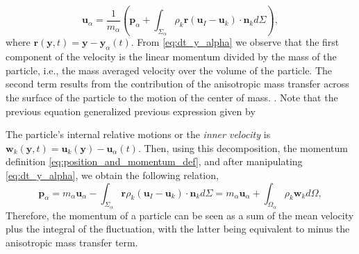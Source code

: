 \begin{equation}
    \textbf{u}_\alpha = \frac{1}{m_\alpha} \left(
        \textbf{p}_\alpha
        +  \int_{\Sigma_\alpha} \rho_k \textbf{r} (\textbf{u}_I - \textbf{u}_k)\cdot \textbf{n}_k d\Sigma
        \right),
        \label{eq:dt_y_alpha}
\end{equation}
where  $\textbf{r}(\textbf{y},t) = \textbf{y} - \textbf{y}_\alpha(t)$. From \ref{eq:dt_y_alpha} we observe that the first component of the velocity is the linear momentum divided by the mass of the particle, i.e., the mass averaged velocity over the volume of the particle. The second term results from the contribution of the anisotropic mass transfer across the surface of the particle to the motion of the center of mass. . Note that the previous equation generalized previous expression given by \citet{morel2015mathematical}%

The particle's internal relative motions or the \textit{inner velocity} is $\textbf{w}_k(\textbf{y},t) = \textbf{u}_k(\textbf{y}) - \textbf{u}_\alpha(t)$.
Then, using this decomposition, the momentum definition \ref{eq:position_and_momentum_def}, and after manipulating \ref{eq:dt_y_alpha}, we obtain the following relation,
\begin{equation}
    \textbf{p}_\alpha
    =  m_\alpha \textbf{u}_\alpha
    - \int_{\Sigma_\alpha} \textbf{r} \rho_k (\textbf{u}_I - \textbf{u}_k)\cdot \textbf{n}_k d\Sigma
    = m_\alpha \textbf{u}_\alpha
    + \int_{\Omega_\alpha} \rho_k \textbf{w}_k d\Omega,
    \label{eq:momentum_definition}
\end{equation}
Therefore, the momentum of a particle can be seen as a sum of the mean velocity plus the integral of the fluctuation, with the latter being equivalent to minus the anisotropic mass transfer term. 

